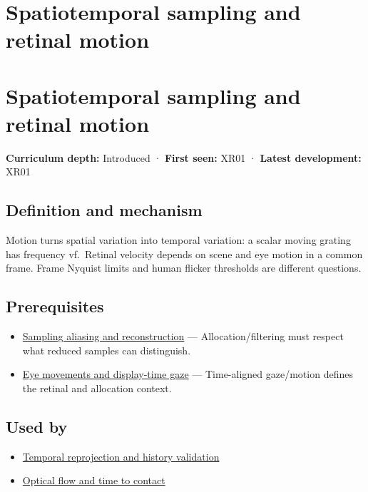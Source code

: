 \hypertarget{appendix-70895739febb}{}
\section*{Spatiotemporal sampling and retinal motion}
\section{Spatiotemporal sampling and retinal motion}\label{spatiotemporal-sampling-and-retinal-motion}

\textbf{Curriculum depth:} Introduced · \textbf{First seen:} XR01 · \textbf{Latest development:} XR01

\subsection{Definition and mechanism}\label{definition-and-mechanism}

Motion turns spatial variation into temporal variation: a scalar moving grating has frequency \textbar v\textbar f.~Retinal velocity depends on scene and eye motion in a common frame. Frame Nyquist limits and human flicker thresholds are different questions.

\subsection{Prerequisites}\label{prerequisites}

\begin{itemize}
\tightlist
\item
  \hyperref[appendix-6a7869dd79a6]{Sampling aliasing and reconstruction} --- Allocation/filtering must respect what reduced samples can distinguish.
\item
  \hyperref[appendix-a6f2c4fe1996]{Eye movements and display-time gaze} --- Time-aligned gaze/motion defines the retinal and allocation context.
\end{itemize}

\subsection{Used by}\label{used-by}

\begin{itemize}
\tightlist
\item
  \hyperref[appendix-0727340a4428]{Temporal reprojection and history validation}
\item
  \hyperref[appendix-e2e73f8cd93e]{Optical flow and time to contact}
\end{itemize}

